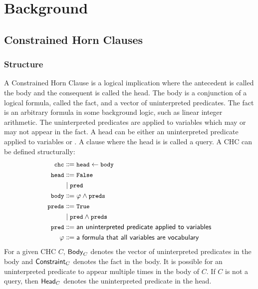 \section{Background}
\label{sec:background}

\subsection{Constrained Horn Clauses}
\label{sec:chcs}

\subsubsection{Structure}
A Constrained Horn Clause is a logical implication where the
antecedent is called the body and the consequent is called the head.
%
The body is a conjunction of a logical formula, called the fact,
and a vector of uninterpreted predicates. The fact is an arbitrary
formula in some background logic, such as linear integer arithmetic.
%
The uninterpreted predicates are applied to variables which may or may
not appear in the fact.
%
A head can be either an uninterpreted predicate applied to variables or .
%
A clause where the head is  is called a query. A CHC can be
defined structurally:
\begin{align*}
\cc{chc} &\Coloneqq \cc{head} \gets \cc{body} \\
\cc{head} &\Coloneqq \cc{False} \\&\mid \cc{pred}  \\
\cc{body} &\Coloneqq \varphi \wedge \cc{preds} \\
\cc{preds} &\Coloneqq \cc{True} \\&\mid \cc{pred} \wedge \cc{preds} \\
\cc{pred} &\Coloneqq \textsf{an uninterpreted predicate applied to variables} \\
\varphi &\Coloneqq \textsf{a formula that all variables are vocabulary} \\
\end{align*}
%
For a given CHC $C$, $\mathsf{Body}_{C}$ denotes the vector of uninterpreted
predicates in the body and $\mathsf{Constraint}_{C}$ denotes the fact in the
body.
%
It is possible for an uninterpreted predicate to appear multiple times
in the body of $C$.
%
If $C$ is not a query, then $\mathsf{Head}_{C}$ denotes the uninterpreted
predicate in the head.
%

